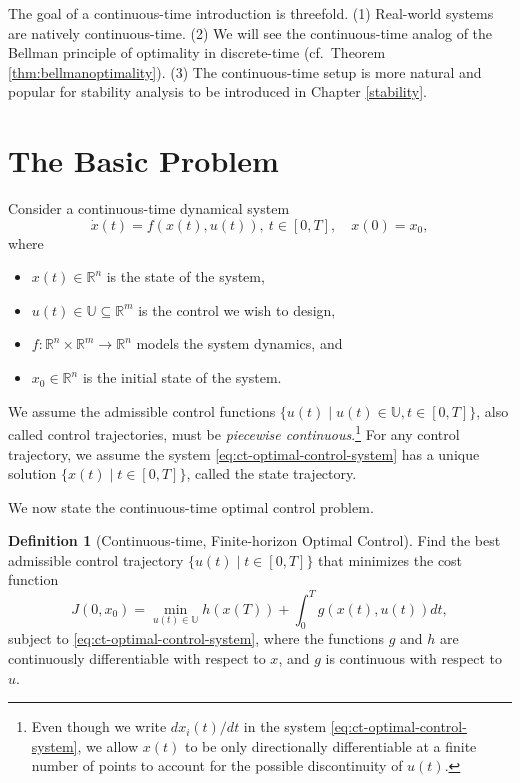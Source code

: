 \documentclass[
]{book}
\theoremstyle{definition}
\newtheorem{definition}{Definition}[chapter]
\theoremstyle{definition}
\theoremstyle{definition}
\theoremstyle{definition}
\theoremstyle{remark}
\begin{document}
The goal of a continuous-time introduction is threefold. (1) Real-world systems are natively continuous-time. (2) We will see the continuous-time analog of the Bellman principle of optimality in discrete-time (cf.~Theorem \ref{thm:bellmanoptimality}). (3) The continuous-time setup is more natural and popular for stability analysis to be introduced in Chapter \ref{stability}.

\hypertarget{the-basic-problem-1}{%
\section{The Basic Problem}\label{the-basic-problem-1}}

Consider a continuous-time dynamical system
\begin{equation}
\dot{x}(t) = f(x(t),u(t)),\ t \in [0,T], \quad x(0) = x_0,
\label{eq:ct-optimal-control-system}
\end{equation}
where

\begin{itemize}
\item
  \(x(t) \in \mathbb{R}^n\) is the state of the system,
\item
  \(u(t) \in \mathbb{U} \subseteq \mathbb{R}^m\) is the control we wish to design,
\item
  \(f: \mathbb{R}^{n} \times \mathbb{R}^m \rightarrow \mathbb{R}^n\) models the system dynamics, and
\item
  \(x_0 \in \mathbb{R}^n\) is the initial state of the system.
\end{itemize}

We assume the admissible control functions \(\{u(t) \mid u(t) \in \mathbb{U}, t\in [0,T] \}\), also called control trajectories, must be \emph{piecewise continuous}.\footnote{Even though we write \(dx_i(t)/dt\) in the system \eqref{eq:ct-optimal-control-system}, we allow \(x(t)\) to be only directionally differentiable at a finite number of points to account for the possible discontinuity of \(u(t)\).} For any control trajectory, we assume the system \eqref{eq:ct-optimal-control-system} has a unique solution \(\{x(t)\mid t \in [0,T] \}\), called the state trajectory.

We now state the continuous-time optimal control problem.

\begin{definition}[Continuous-time, Finite-horizon Optimal Control]
\protect\hypertarget{def:continuoustimeoptimalcontrol}{}\label{def:continuoustimeoptimalcontrol}Find the best admissible control trajectory \(\{u(t) \mid t \in [0,T] \}\) that minimizes the cost function
\begin{equation}
J(0,x_0) = \min_{u(t) \in \mathbb{U}} h(x(T)) + \int_0^T g(x(t),u(t)) dt,
\label{eq:ct-optimal-control-definition}
\end{equation}
subject to \eqref{eq:ct-optimal-control-system}, where the functions \(g\) and \(h\) are continuously differentiable with respect to \(x\), and \(g\) is continuous with respect to \(u\).
\end{definition}
\end{document}
